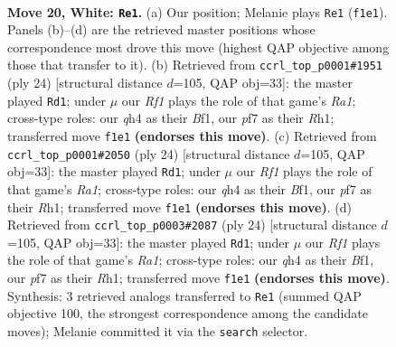 \documentclass[11pt]{article}
\begin{document}
\clearpage

\begin{figure}[p]\centering
\begin{subfigure}{0.46\textwidth}\centering
\resizebox{\linewidth}{!}{%
\newchessgame
\chessboard[
  setfen={r1br4/ppp2pk1/3p4/4b2p/N1P1Pnpq/4Q2P/PP3PP1/RBB2RK1 w - - 0 20},
  showmover=false,
  pgfstyle=straightmove, color=movearrow, markmove={f1-e1}
]}
\caption{}
\end{subfigure}\hfill
\begin{subfigure}{0.46\textwidth}\centering
\resizebox{\linewidth}{!}{%
\newchessgame
\chessboard[
  setfen={rn2kb1r/pb3p2/2p1p2p/1p6/2pqP1QP/2N3B1/PP3PP1/R3KB1R w KQkq - 0 13},
  showmover=false,
  pgfstyle=straightmove, color=movearrow, markmove={a1-d1}
]}
\caption{}
\end{subfigure}
\\[4pt]
\begin{subfigure}{0.46\textwidth}\centering
\resizebox{\linewidth}{!}{%
\newchessgame
\chessboard[
  setfen={rn2kb1r/pb3p2/2p1p2p/1p6/2pqP1QP/2N3B1/PP3PP1/R3KB1R w KQkq - 0 13},
  showmover=false,
  pgfstyle=straightmove, color=movearrow, markmove={a1-d1}
]}
\caption{}
\end{subfigure}\hfill
\begin{subfigure}{0.46\textwidth}\centering
\resizebox{\linewidth}{!}{%
\newchessgame
\chessboard[
  setfen={rn2kb1r/pb3p2/2p1p2p/1p6/2pqP1QP/2N3B1/PP3PP1/R3KB1R w KQkq - 0 13},
  showmover=false,
  pgfstyle=straightmove, color=movearrow, markmove={a1-d1}
]}
\caption{}
\end{subfigure}
\caption{\textbf{Move 20, White: \texttt{Re1}.} (a) Our position; Melanie plays \texttt{Re1} (\texttt{f1e1}). Panels (b)--(d) are the retrieved master positions whose correspondence most drove this move (highest QAP objective among those that transfer to it). (b) Retrieved from \texttt{ccrl\_top\_p0001\#1951} (ply 24) [structural distance $d$=105, QAP obj=33]: the master played \texttt{Rd1}; under $\mu$ our \emph{Rf1} plays the role of that game's \emph{Ra1}; cross-type roles: our \emph{q}h4 as their \emph{B}f1, our \emph{p}f7 as their \emph{R}h1; transferred move \texttt{f1e1} \textbf{(endorses this move)}. (c) Retrieved from \texttt{ccrl\_top\_p0001\#2050} (ply 24) [structural distance $d$=105, QAP obj=33]: the master played \texttt{Rd1}; under $\mu$ our \emph{Rf1} plays the role of that game's \emph{Ra1}; cross-type roles: our \emph{q}h4 as their \emph{B}f1, our \emph{p}f7 as their \emph{R}h1; transferred move \texttt{f1e1} \textbf{(endorses this move)}. (d) Retrieved from \texttt{ccrl\_top\_p0003\#2087} (ply 24) [structural distance $d$=105, QAP obj=33]: the master played \texttt{Rd1}; under $\mu$ our \emph{Rf1} plays the role of that game's \emph{Ra1}; cross-type roles: our \emph{q}h4 as their \emph{B}f1, our \emph{p}f7 as their \emph{R}h1; transferred move \texttt{f1e1} \textbf{(endorses this move)}. Synthesis: 3 retrieved analogs transferred to \texttt{Re1} (summed QAP objective 100, the strongest correspondence among the candidate moves); Melanie committed it via the \texttt{search} selector.}
\label{fig:thought-m38}
\end{figure}
\end{document}
